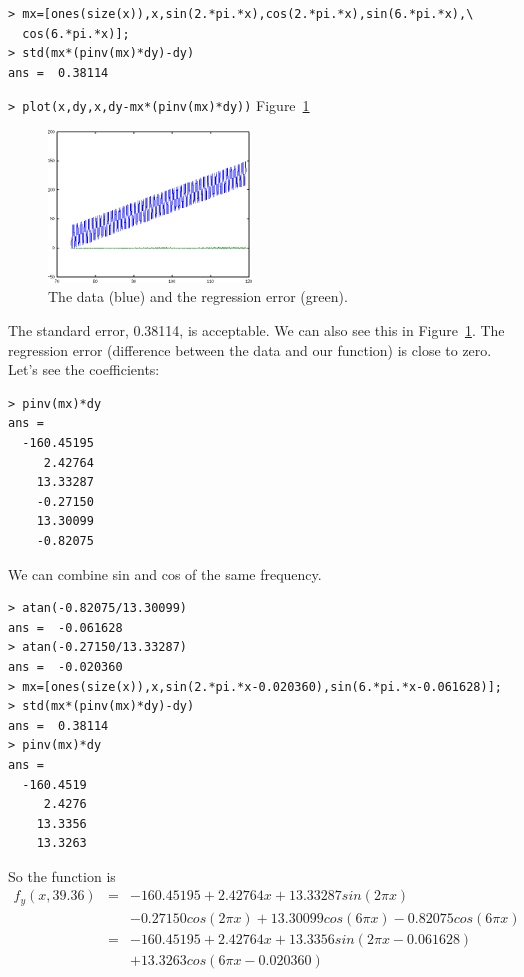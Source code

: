 \documentclass[a4paper]{article}
\begin{document}
\begin{verbatim}
> mx=[ones(size(x)),x,sin(2.*pi.*x),cos(2.*pi.*x),sin(6.*pi.*x),\
  cos(6.*pi.*x)];
> std(mx*(pinv(mx)*dy)-dy)
ans =  0.38114
\end{verbatim}
\verb|> plot(x,dy,x,dy-mx*(pinv(mx)*dy))| \hfill Figure~\ref{fig:fyx-lc}

\begin{figure}[htb]
\begin{center}
\includegraphics[width=0.48\textwidth]{fyx-lc.png}
\end{center}
\caption{The data (blue) and the regression error (green).}
\label{fig:fyx-lc}
\end{figure}
The standard error, 0.38114, is acceptable.
We can also see this in Figure~\ref{fig:fyx-lc}.
The regression error (difference between the data and our function) is close
to zero.
Let's see the coefficients:

\begin{verbatim}
> pinv(mx)*dy
ans =
  -160.45195
     2.42764
    13.33287
    -0.27150
    13.30099
    -0.82075
\end{verbatim}

We can combine sin and cos of the same frequency.

\begin{verbatim}
> atan(-0.82075/13.30099)
ans =  -0.061628
> atan(-0.27150/13.33287)
ans =  -0.020360
> mx=[ones(size(x)),x,sin(2.*pi.*x-0.020360),sin(6.*pi.*x-0.061628)];
> std(mx*(pinv(mx)*dy)-dy)
ans =  0.38114
> pinv(mx)*dy
ans =
  -160.4519
     2.4276
    13.3356
    13.3263
\end{verbatim}
So the function is
\begin{eqnarray}
f_y(x,39.36) & = & -160.45195+2.42764x+13.33287sin(2\pi x) \nonumber \\
             &   & -0.27150cos(2\pi x)+13.30099cos(6\pi x)-0.82075cos(6\pi x) \nonumber \\
             & = & -160.45195+2.42764x+13.3356sin(2\pi x-0.061628) \nonumber \\
             &   & +13.3263cos(6\pi x-0.020360)
\end{eqnarray}
\end{document}
